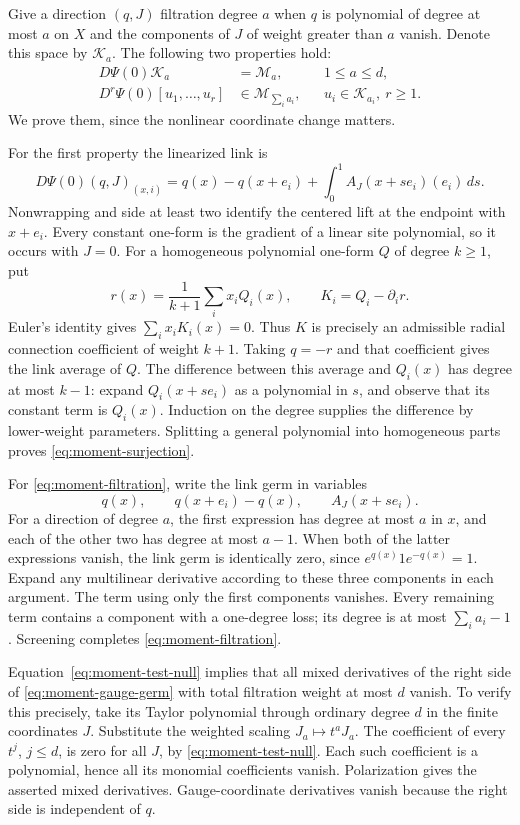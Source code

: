 Give a direction $(q,J)$ filtration degree $a$ when $q$ is
polynomial of degree at most $a$ on $X$ and the components of
$J$ of weight greater than $a$ vanish. Denote this space by
$\mathcal K_a$. The following two properties hold:
\begin{align}
 D\Psi(0)\mathcal K_a&=\mathcal M_a,
       &&1\le a\le d,\label{eq:moment-surjection}\\
 D^r\Psi(0)[u_1,\ldots,u_r]&\in\mathcal M_{\sum_i a_i},
       &&u_i\in\mathcal K_{a_i},\ r\ge1.
       \label{eq:moment-filtration}
\end{align}
We prove them, since the nonlinear coordinate change matters.

For the first property the linearized link is
\[
 D\Psi(0)(q,J)_{(x,i)}
       =q(x)-q(x+e_i)+\int_0^1 A_J(x+se_i)(e_i)\,ds.
\]
Nonwrapping and side at least two identify the centered lift at
the endpoint with $x+e_i$. Every constant one-form is the gradient
of a linear site polynomial, so it occurs with $J=0$. For a
homogeneous polynomial one-form $Q$ of degree $k\ge1$, put
\[
 r(x)=\frac1{k+1}\sum_i x_iQ_i(x),\qquad K_i=Q_i-\partial_i r.
\]
Euler's identity gives $\sum_i x_iK_i(x)=0$. Thus $K$ is precisely
an admissible radial connection coefficient of weight $k+1$.
Taking $q=-r$ and that coefficient gives the link average of $Q$.
The difference between this average and $Q_i(x)$ has degree at
most $k-1$: expand $Q_i(x+se_i)$ as a polynomial in $s$, and
observe that its constant term is $Q_i(x)$. Induction on the
degree supplies the difference by lower-weight parameters.
Splitting a general polynomial into homogeneous parts proves
\eqref{eq:moment-surjection}.

For \eqref{eq:moment-filtration}, write the link germ in variables
\[
     q(x),\qquad q(x+e_i)-q(x),\qquad A_J(x+se_i).
\]
For a direction of degree $a$, the first expression has degree
at most $a$ in $x$, and each of the other two has degree at most
$a-1$. When both of the latter expressions vanish, the link germ
is identically zero, since $e^{q(x)}1e^{-q(x)}=1$. Expand any
multilinear derivative according to these three components in
each argument. The term using only the first components vanishes.
Every remaining term contains a component with a one-degree
loss; its degree is at most $\sum_i a_i-1$. Screening completes
\eqref{eq:moment-filtration}.

Equation~\eqref{eq:moment-test-null} implies that all mixed
derivatives of the right side of \eqref{eq:moment-gauge-germ}
with total filtration weight at most $d$ vanish. To verify this
precisely, take its Taylor polynomial through ordinary degree
$d$ in the finite coordinates $J$. Substitute the weighted
scaling $J_a\mapsto t^aJ_a$. The coefficient of every $t^j$,
$j\le d$, is zero for all $J$, by \eqref{eq:moment-test-null}.
Each such coefficient is a polynomial, hence all its monomial
coefficients vanish. Polarization gives the asserted mixed
derivatives. Gauge-coordinate derivatives vanish because the
right side is independent of $q$.

